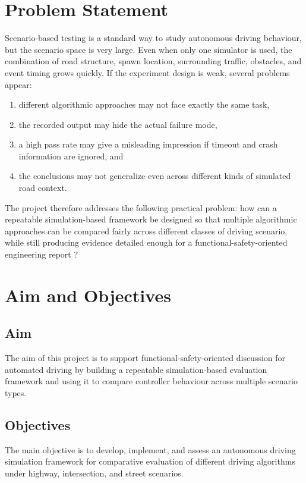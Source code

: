 \documentclass[12pt,a4paper]{report}
\begin{document}
\section{Problem Statement}
Scenario-based testing is a standard way to study autonomous driving behaviour, but the scenario space is very large. Even when only one simulator is used, the combination of road structure, spawn location, surrounding traffic, obstacles, and event timing grows quickly. If the experiment design is weak, several problems appear:

\begin{enumerate}[label=\arabic*.]
    \item different algorithmic approaches may not face exactly the same task,
    \item the recorded output may hide the actual failure mode,
    \item a high pass rate may give a misleading impression if timeout and crash information are ignored, and
    \item the conclusions may not generalize even across different kinds of simulated road context.
\end{enumerate}

The project therefore addresses the following practical problem: how can a repeatable simulation-based framework be designed so that multiple algorithmic approaches can be compared fairly across different classes of driving scenario, while still producing evidence detailed enough for a functional-safety-oriented engineering report \cite{wang2024scenario,song2023critical,skoglund2025safety}?

\section{Aim and Objectives}
\subsection*{Aim}
The aim of this project is to support functional-safety-oriented discussion for automated driving by building a repeatable simulation-based evaluation framework and using it to compare controller behaviour across multiple scenario types.

\subsection*{Objectives}
The main objective is to develop, implement, and assess an autonomous driving simulation framework for comparative evaluation of different driving algorithms under highway, intersection, and street scenarios.
\end{document}
